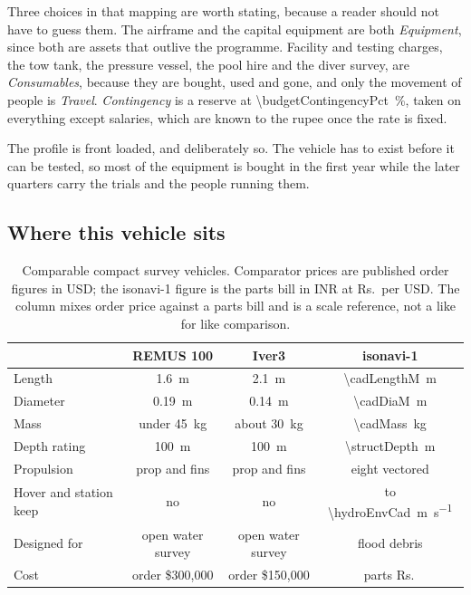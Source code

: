 \documentclass[10pt,a4paper]{article}
\newcommand{\rupeesign}{Rs.}
\newcommand{\INR}[1]{Rs.\,#1}
\begin{document}
Three choices in that mapping are worth stating, because a reader should not
have to guess them. The airframe and the capital equipment are both
\emph{Equipment}, since both are assets that outlive the programme. Facility
and testing charges, the tow tank, the pressure vessel, the pool hire and the
diver survey, are \emph{Consumables}, because they are bought, used and gone,
and only the movement of people is \emph{Travel}. \emph{Contingency} is a
reserve at \SI{\budgetContingencyPct}{\percent}, taken on everything except
salaries, which are known to the rupee once the rate is fixed.

The profile is front loaded, and deliberately so. The vehicle has to exist
before it can be tested, so most of the equipment is bought in the first year
while the later quarters carry the trials and the people running them.

\begin{table}[htbp]\centering\small
\caption{Programme budget under the standard heads, phased by quarter.
Generated from the same line items as Tables~\ref{tab:budgetA}
to~\ref{tab:budgetE}, so the two views cannot disagree.}
\label{tab:budgetheads}

\end{table}

\subsection{Where this vehicle sits}

\begin{table}[htbp]\centering\small
\caption{Comparable compact survey vehicles. Comparator prices are published
order figures in USD; the isonavi-1 figure is the parts bill in INR at
\rupeesign\,\bomRate{} per USD. The column mixes order price against a parts
bill and is a scale reference, not a like for like comparison.}
\begin{tabular}{lccc}
\toprule
& \textbf{REMUS 100} & \textbf{Iver3} & \textbf{isonavi-1} \\
\midrule
Length & \SI{1.6}{\metre} & \SI{2.1}{\metre} &
\SI{\cadLengthM}{\metre} \\
Diameter & \SI{0.19}{\metre} & \SI{0.14}{\metre} &
\SI{\cadDiaM}{\metre} \\
Mass & under \SI{45}{\kilo\gram} & about \SI{30}{\kilo\gram} &
\SI{\cadMass}{\kilo\gram} \\
Depth rating & \SI{100}{\metre} & \SI{100}{\metre} &
\SI{\structDepth}{\metre} \\
Propulsion & prop and fins & prop and fins & eight vectored \\
Hover and station keep & no & no & to
\SI{\hydroEnvCad}{\metre\per\second} \\
Designed for & open water survey & open water survey & flood debris \\
Cost & order \$300{,}000 & order \$150{,}000 &
parts \INR{\bomTotal} \\
\bottomrule
\end{tabular}
\end{table}
\end{document}
